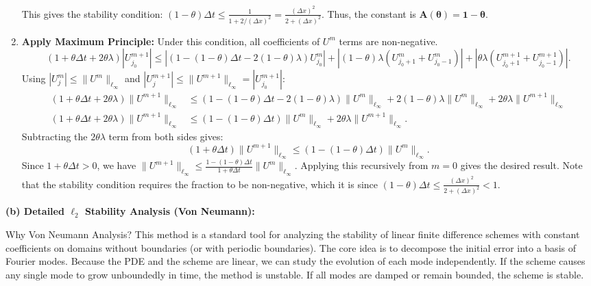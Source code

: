 \begin{solution}
\begin{enumerate}
\[    \]
    This gives the stability condition: $(1-\theta)\Delta t \leq \frac{1}{1 + 2/(\Delta x)^2} = \frac{(\Delta x)^2}{2 + (\Delta x)^2}$.
    Thus, the constant is $\mathbf{A(\theta) = 1-\theta}$.
    \item \textbf{Apply Maximum Principle:} Under this condition, all coefficients of $U^m$ terms are non-negative.
    \[
    (1 + \theta \Delta t + 2\theta\lambda)|U_{j_0}^{m+1}| \leq |(1 - (1-\theta)\Delta t - 2(1-\theta)\lambda)U_{j_0}^m| + |(1-\theta)\lambda(U_{j_0+1}^m + U_{j_0-1}^m)| + |\theta\lambda(U_{j_0+1}^{m+1} + U_{j_0-1}^{m+1})|.
    \]
    Using $|U_j^m| \leq \|U^m\|_{\ell_\infty}$ and $|U_j^{m+1}| \leq \|U^{m+1}\|_{\ell_\infty} = |U_{j_0}^{m+1}|$:
    \begin{align*}
    (1 + \theta \Delta t + 2\theta\lambda)\|U^{m+1}\|_{\ell_\infty} &\leq (1 - (1-\theta)\Delta t - 2(1-\theta)\lambda)\|U^m\|_{\ell_\infty} + 2(1-\theta)\lambda\|U^m\|_{\ell_\infty} + 2\theta\lambda\|U^{m+1}\|_{\ell_\infty} \\
    (1 + \theta \Delta t + 2\theta\lambda)\|U^{m+1}\|_{\ell_\infty} &\leq (1 - (1-\theta)\Delta t)\|U^m\|_{\ell_\infty} + 2\theta\lambda\|U^{m+1}\|_{\ell_\infty}.
    \end{align*}
    Subtracting the $2\theta\lambda$ term from both sides gives:
    \[
    (1 + \theta\Delta t)\|U^{m+1}\|_{\ell_\infty} \leq (1 - (1-\theta)\Delta t)\|U^m\|_{\ell_\infty}.
    \]
    Since $1+\theta\Delta t > 0$, we have $\|U^{m+1}\|_{\ell_\infty} \leq \frac{1 - (1-\theta)\Delta t}{1 + \theta\Delta t} \|U^m\|_{\ell_\infty}$. Applying this recursively from $m=0$ gives the desired result. Note that the stability condition requires the fraction to be non-negative, which it is since $(1-\theta)\Delta t \leq \frac{(\Delta x)^2}{2 + (\Delta x)^2} < 1$.
\end{enumerate}

\textbf{(b) Detailed $\ell_2$ Stability Analysis (Von Neumann):}
\begin{remarkbox}{Why Von Neumann Analysis?}
This method is a standard tool for analyzing the stability of linear finite difference schemes with constant coefficients on domains without boundaries (or with periodic boundaries). The core idea is to decompose the initial error into a basis of Fourier modes. Because the PDE and the scheme are linear, we can study the evolution of each mode independently. If the scheme causes any single mode to grow unboundedly in time, the method is unstable. If all modes are damped or remain bounded, the scheme is stable.


\end{remarkbox}
\end{solution}
